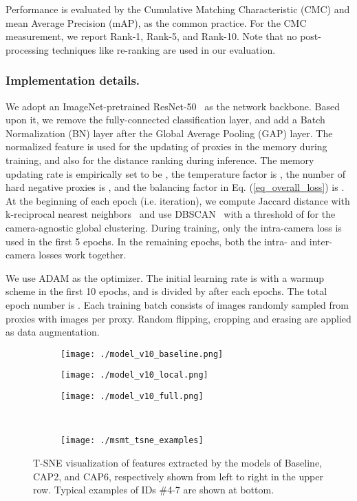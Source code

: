 \documentclass[letterpaper]{article} \usepackage{aaai21}  \usepackage{times}  \usepackage{helvet} \usepackage{courier}  \usepackage[hyphens]{url}  \usepackage{graphicx} \usepackage{subcaption}
\begin{document}
Performance is evaluated by the Cumulative Matching Characteristic (CMC) and mean Average Precision (mAP), as the common practice. For the CMC measurement, we report Rank-1, Rank-5, and Rank-10. Note that no post-processing techniques like re-ranking \cite{Zhong2017reranking} are used in our evaluation.


\subsubsection{Implementation details.} 
We adopt an ImageNet-pretrained ResNet-50~\cite{he2016deep} as the network backbone. Based upon it, we remove the fully-connected classification layer, and add a Batch Normalization (BN) layer after the Global Average Pooling (GAP) layer. The  normalized feature is used for the updating of proxies in the memory during training, and also for the distance ranking during inference. The memory updating rate  is empirically set to be , the temperature factor  is , the number of hard negative proxies is , and the balancing factor  in Eq. (\ref{eq_overall_loss}) is . At the beginning of each epoch (i.e. iteration), we compute Jaccard distance with k-reciprocal nearest neighbors~\cite{Zhong2017reranking} and use DBSCAN~\cite{ester1996density} with a threshold of  for the camera-agnostic global clustering. During training, only the intra-camera loss is used in the first 5 epochs. In the remaining epochs, both the intra- and inter-camera losses work together. 

We use ADAM as the optimizer. The initial learning rate is  with a warmup scheme in the first 10 epochs, and is divided by  after each  epochs. The total epoch number is . Each training batch consists of  images randomly sampled from  proxies with  images per proxy. Random flipping, cropping and erasing are applied as data augmentation. 

\begin{figure*}[t]
\centering
\begin{subfigure}{0.29\textwidth}
\centering
\texttt{[image: ./model\_v10\_baseline.png]} 
\end{subfigure}
\quad
\begin{subfigure}{0.29\textwidth}
\centering
\texttt{[image: ./model\_v10\_local.png]}
\end{subfigure}
\quad
\begin{subfigure}{0.29\textwidth}
\centering
\texttt{[image: ./model\_v10\_full.png]}
\end{subfigure}
\\
\begin{subfigure}{0.9\textwidth}
\centering
\texttt{[image: ./msmt\_tsne\_examples]}
\end{subfigure}
\caption{T-SNE visualization of features extracted by the models of Baseline, CAP2, and CAP6, respectively shown from left to right in the upper row. Typical examples of IDs \#4-7 are shown at bottom.}
\label{fig_compare_tsne}
\end{figure*}
\end{document}
